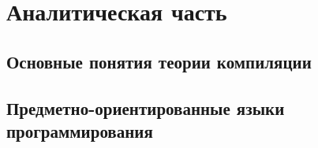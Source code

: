 \chapter{Аналитическая часть} \label{chapt1}

\section{Основные понятия теории компиляции} \label{sec11} 



 






\section{Предметно-ориентированные языки программирования} \label{sec12}


